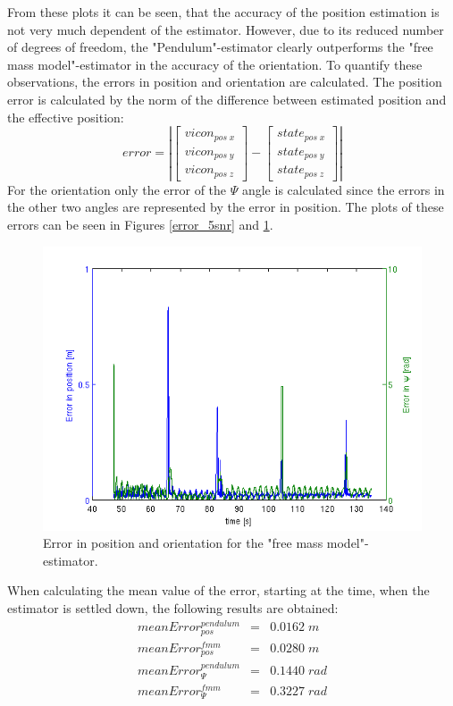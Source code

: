 From these plots it can be seen, that the accuracy of the position estimation is not very much dependent of the estimator. However, due to its reduced number of degrees of freedom, the "Pendulum"-estimator clearly outperforms the "free mass model"-estimator in the accuracy of the orientation. 
To quantify these observations, the errors in position and orientation are calculated. The position error is calculated by the norm of the difference between estimated position and the effective position: 
\begin{equation}
error= \left| \begin{bmatrix} vicon_{pos\;x} \\ vicon_{pos\;y} \\ vicon_{pos\;z} \end{bmatrix}-\begin{bmatrix}state_{pos\;x} \\ state_{pos\;y} \\ state_{pos\;z}  \end{bmatrix}\right|
\end{equation}
For the orientation only the error of the $\Psi$ angle is calculated since the errors in the other two angles are represented by the error in position. 
The plots of these errors can be seen in Figures \ref{error_5snr} and \ref{error_5snr_fmm}. 
\begin{figure}[hb]
\centering
\includegraphics[width=1\textwidth]{pictures/2_2_fmm_SNR5_errors_GPS.png}
\caption{Error in position and orientation for the "free mass model"-estimator.}
\label{error_5snr_fmm}
\end{figure}
When calculating the mean value of the error, starting at the time, when the estimator is settled down, the following results are obtained:
\begin{eqnarray}
meanError_{pos}^{pendulum}&=&0.0162\;m \\ meanError_{pos}^{fmm}&=&0.0280\;m \\ meanError_{\Psi}^{pendulum}&=& 0.1440\;rad\\ meanError_{\Psi}^{fmm}&=& 0.3227 \;rad
\end{eqnarray} 

